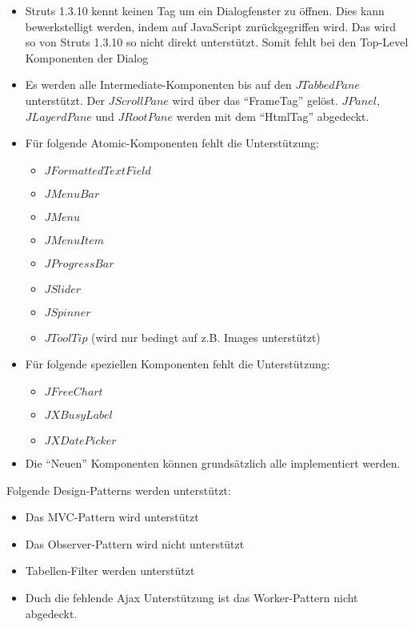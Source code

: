 \begin{itemize}
  \item Struts 1.3.10 kennt keinen Tag um ein Dialogfenster zu öffnen. Dies kann
  bewerkstelligt werden, indem auf JavaScript zurückgegriffen wird. Das wird so
  von Struts 1.3.10 so nicht direkt unterstützt. Somit fehlt bei den Top-Level
  Komponenten der Dialog
  \item Es werden alle Intermediate-Komponenten bis auf den
  \(JTabbedPane\) unterstützt. Der \(JScrollPane\) wird über das ``FrameTag''
  gelöst. \(JPanel\), \(JLayerdPane\) und \(JRootPane\) werden mit dem
  ``HtmlTag'' abgedeckt.
  \item Für folgende Atomic-Komponenten fehlt die Unterstützung:
  \begin{itemize}
    \item \(JFormattedTextField\)
    \item \(JMenuBar\)
    \item \(JMenu\)
    \item \(JMenuItem\)
    \item \(JProgressBar\)
    \item \(JSlider\)
    \item \(JSpinner\)
    \item \(JToolTip\) (wird nur bedingt auf z.B. Images unterstützt)
  \end{itemize}
  \item Für folgende speziellen Komponenten fehlt die Unterstützung:
  \begin{itemize}
    \item \(JFreeChart\)
    \item \(JXBusyLabel\)
    \item \(JXDatePicker\)
  \end{itemize}
  \item Die ``Neuen'' Komponenten können grundsätzlich alle implementiert
  werden.
\end{itemize}

Folgende Design-Patterns werden unterstützt:

\begin{itemize}
  \item Das MVC-Pattern wird unterstützt
  \item Das Observer-Pattern wird nicht unterstützt
  \item Tabellen-Filter werden unterstützt
  \item Duch die fehlende \ac{Ajax} Unterstützung ist das
  Worker-Pattern nicht abgedeckt.
\end{itemize}

